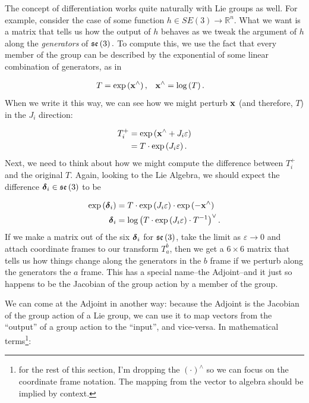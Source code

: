 
\label{sec:ad_as_jacobian}



The concept of differentiation works quite naturally with Lie groups
as well. For example, consider the case of some function $h\in SE(3)\to\mathbb{R}^{n}.$
What we want is a matrix that tells us how the output of $h$ behaves
as we tweak the argument of $h$ along the \emph{generators }of $\mathfrak{se}\left(3\right).$
To compute this, we use the fact that every member of the group can
be described by the exponential of some linear combination of generators,
as in

\begin{align*}
T & =\exp\left(\mathbf{x}^{\wedge}\right), & \mathbf{x}^{\wedge} & =\log\left(T\right).
\end{align*}
When we write it this way, we can see how we might perturb $\mathbf{x}$ (and
therefore, $T$) in the $J_{i}$ direction:

\begin{align*}
T_{i}^{+} & =\exp\left(\mathbf{x}^{\wedge}+J_{i}\varepsilon\right)\\
 & =T\cdot\exp\left(J_{i}\varepsilon\right).
\end{align*}
Next, we need to think about how we might compute the difference between
$T_{i}^{+}$ and the original $T$. Again, looking to the Lie Algebra,
we should expect the difference $\boldsymbol{\delta}_{i}\in\mathfrak{se}\left(3\right)$ to
be

\begin{align}
\exp\left(\deltabf_{i}\right) & =T\cdot\exp\left(J_{i}\varepsilon\right)\cdot\exp\left(-\xbf^{\wedge}\right)\nonumber \\
\deltabf_{i} & =\log\left(T\cdot\exp\left(J_{i}\varepsilon\right)\cdot T^{-1}\right)^{\vee}.\label{eq:adjoint_start}
\end{align}
If we make a matrix out of the six $\boldsymbol{\delta}_{i}$ for $\mathfrak{se}\left(3\right)$,
take the limit as $\varepsilon\to0$ and attach coordinate frames
to our transform $T_{a}^{b}$, then we get a $6\times6$ matrix that
tells us how things change along the generators in the $b$ frame
if we perturb along the generators the $a$ frame. This has a special
name--the Adjoint--and it just so happens to be the Jacobian of
the group action by a member of the group.

We can come at the Adjoint in another way: because the Adjoint is
the Jacobian of the group action of a Lie group, we can use it to
map vectors from the ``output'' of a group action to the ``input'',
and vice-versa. In mathematical terms\footnote{for the rest of this section, I'm dropping the $\left(\cdot\right)^{\wedge}$
so we can focus on the coordinate frame notation. The mapping from
the vector to algebra should be implied by context.}:

